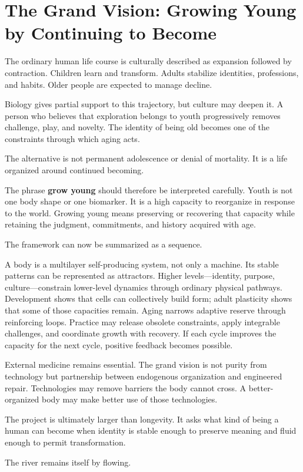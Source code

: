 \chapter{The Grand Vision: Growing Young by Continuing to Become}\label{chapter-20-the-grand-vision-growing-young-by-continuing-to-become}

The ordinary human life course is culturally described as expansion followed by contraction. Children learn and transform. Adults stabilize identities, professions, and habits. Older people are expected to manage decline.

Biology gives partial support to this trajectory, but culture may deepen it. A person who believes that exploration belongs to youth progressively removes challenge, play, and novelty. The identity of being old becomes one of the constraints through which aging acts.

The alternative is not permanent adolescence or denial of mortality. It is a life organized around continued becoming.

The phrase \textbf{grow young} should therefore be interpreted carefully. Youth is not one body shape or one biomarker. It is a high capacity to reorganize in response to the world. Growing young means preserving or recovering that capacity while retaining the judgment, commitments, and history acquired with age.

The framework can now be summarized as a sequence.

A body is a multilayer self-producing system, not only a machine. Its stable patterns can be represented as attractors. Higher levels---identity, purpose, culture---constrain lower-level dynamics through ordinary physical pathways. Development shows that cells can collectively build form; adult plasticity shows that some of those capacities remain. Aging narrows adaptive reserve through reinforcing loops. Practice may release obsolete constraints, apply integrable challenges, and coordinate growth with recovery. If each cycle improves the capacity for the next cycle, positive feedback becomes possible.

External medicine remains essential. The grand vision is not purity from technology but partnership between endogenous organization and engineered repair. Technologies may remove barriers the body cannot cross. A better-organized body may make better use of those technologies.

The project is ultimately larger than longevity. It asks what kind of being a human can become when identity is stable enough to preserve meaning and fluid enough to permit transformation.

The river remains itself by flowing.
